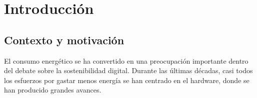 % 
% 
% 
% 
% 
% 
% 
% 

\chapter{Introducción}
\label{cha:introduccion}
%


\section{Contexto y motivación}
\label{sec:contexto-motivacion}

El consumo energético se ha convertido en una preocupación
importante dentro del debate sobre la sostenibilidad digital. Durante las
últimas décadas, casi todos los esfuerzos por gastar menos energía se han
centrado en el hardware, donde se han producido grandes avances.

